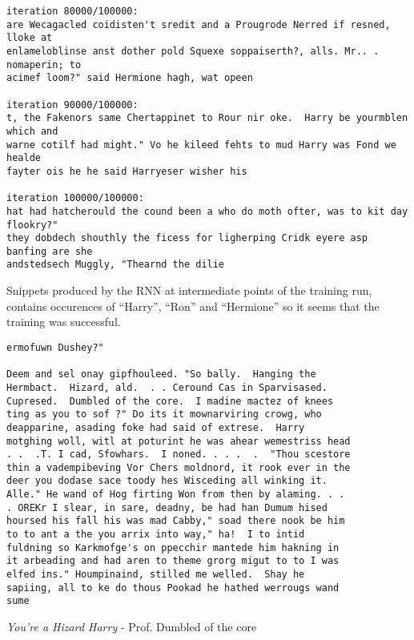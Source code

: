 \documentclass{article}
\begin{document}
\begin{listing}
\begin{verbatim}
iteration 80000/100000:
are Wecagacled coidisten't sredit and a Prougrode Nerred if resned, lloke at
enlameloblinse anst dother pold Squexe soppaiserth?, alls. Mr.. . nomaperin; to
acimef loom?" said Hermione hagh, wat opeen

iteration 90000/100000:
t, the Fakenors same Chertappinet to Rour nir oke.  Harry be yourmblen which and
warne cotilf had might." Vo he kileed fehts to mud Harry was Fond we healde
fayter ois he he said Harryeser wisher his

iteration 100000/100000:
hat had hatcherould the cound been a who do moth ofter, was to kit day flookry?"
they dobdech shouthly the ficess for ligherping Cridk eyere asp banfing are she
andstedsech Muggly, "Thearnd the dilie
\end{verbatim}
\caption{Snippets produced by the RNN at intermediate points of the training run,
         contains occurences of ``Harry'', ``Ron'' and ``Hermione'' so it seems
         that the training was successful.}
\label{lst:snippets}
\end{listing}

\begin{listing}
\begin{verbatim}
ermofuwn Dushey?"

Deem and sel onay gipfhouleed. "So bally.  Hanging the
Hermbact.  Hizard, ald.  . . Ceround Cas in Sparvisased.
Cupresed.  Dumbled of the core.  I madine mactez of knees
ting as you to sof ?" Do its it mownarviring crowg, who
deapparine, asading foke had said of extrese.  Harry
motghing woll, witl at poturint he was ahear wemestriss head
. .  .T. I cad, Sfowhars.  I noned. . . .  .  "Thou scestore
thin a vadempibeving Vor Chers moldnord, it rook ever in the
deer you dodase sace toody hes Wisceding all winking it.
Alle." He wand of Hog firting Won from then by alaming. . .
. OREKr I slear, in sare, deadny, be had han Dumum hised
hoursed his fall his was mad Cabby," soad there nook be him
to to ant a the you arrix into way," ha!  I to intid
fuldning so Karkmofge's on ppecchir mantede him hakning in
it arbeading and had aren to theme grorg migut to to I was
elfed ins." Houmpinaind, stilled me welled.  Shay he
sapiing, all to ke do thous Pookad he hathed werrougs wand
sume
\end{verbatim}
\caption{\textit{You're a Hizard Harry} - Prof. Dumbled of the core}
\label{lst:final_text}
\end{listing}
\end{document}
